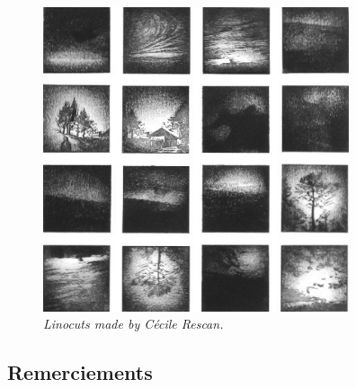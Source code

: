 
\newpage
\null\vfill

\begin{figure}
\vspace*{-0cm}
\centering
\includegraphics[width = 9cm]{img/cecile_rescan.png}
\caption*{\footnotesize\emph{Linocuts made by Cécile Rescan.}}
\vspace*{-0cm}
\label{fig:gravurececile}
\end{figure}

\vfill\null

\newpage

\subsection*{Remerciements}


